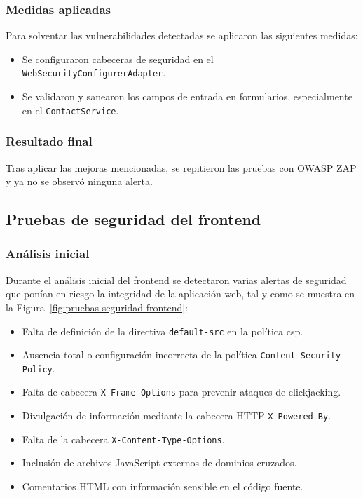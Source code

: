 \subsubsection{Medidas aplicadas}
Para solventar las vulnerabilidades detectadas se aplicaron las siguientes medidas:
\begin{itemize}
    \item Se configuraron cabeceras de seguridad en el \texttt{WebSecurityConfigurerAdapter}.
    \item Se validaron y sanearon los campos de entrada en formularios, especialmente en el \texttt{ContactService}.
\end{itemize}

\subsubsection{Resultado final}
Tras aplicar las mejoras mencionadas, se repitieron las pruebas con OWASP ZAP y ya no se observó ninguna alerta.

\subsection{Pruebas de seguridad del frontend}
\subsubsection{Análisis inicial}
Durante el análisis inicial del frontend se detectaron varias alertas de seguridad que ponían en riesgo la integridad de la aplicación web, tal y como se muestra en la Figura~\ref{fig:pruebas-seguridad-frontend}:

\begin{itemize}
    \item Falta de definición de la directiva \texttt{default-src} en la política \gls{csp}.
    \item Ausencia total o configuración incorrecta de la política \texttt{Content-Security-Policy}.
    \item Falta de cabecera \texttt{X-Frame-Options} para prevenir ataques de clickjacking.
    \item Divulgación de información mediante la cabecera HTTP \texttt{X-Powered-By}.
    \item Falta de la cabecera \texttt{X-Content-Type-Options}.
    \item Inclusión de archivos JavaScript externos de dominios cruzados.
    \item Comentarios HTML con información sensible en el código fuente.
\end{itemize}

